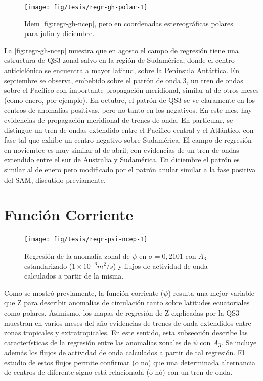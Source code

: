 \documentclass[spanish,a4paper,12pt,oneside]{book}
\begin{document}
\begin{figure}
\texttt{[image: fig/tesis/regr-gh-polar-1]} \caption{Idem \autoref{fig:regr-gh-ncep}, pero en coordenadas estereográficas polares para julio y diciembre.}\label{fig:regr-gh-polar}
\end{figure}

La \autoref{fig:regr-gh-ncep} muestra que en agosto el campo de
regresión tiene una estructura de QS3 zonal salvo en la región de
Sudamérica, donde el centro anticiclónico se encuentra a mayor latitud,
sobre la Península Antártica. En septiembre se observa, embebido sobre
el patrón de onda 3, un tren de ondas sobre el Pacífico con importante
propagación meridional, similar al de otros meses (como enero, por
ejemplo). En octubre, el patrón de QS3 se ve claramente en los centros
de anomalías positivas, pero no tanto en los negativos. En este mes, hay
evidencias de propagación meridional de trenes de onda. En particular,
se distingue un tren de ondas extendido entre el Pacífico central y el
Atlántico, con fase tal que exhibe un centro negativo sobre Sudamérica.
El campo de regresión en noviembre es muy similar al de abril; con
evidencias de un tren de ondas extendido entre el sur de Australia y
Sudamérica. En diciembre el patrón es similar al de enero pero
modificado por el patrón anular similar a la fase positiva del SAM,
discutido previamente.

\section*{Función Corriente}

\begin{landscape}\begin{figure}

{\centering \texttt{[image: fig/tesis/regr-psi-ncep-1]} 

}

\caption{Regresión de la anomalía zonal de $\psi$ en $\sigma = 0,2101$ con $A_3$ estandarizado ($1\times10^{-6}m^2/s$) y flujos de actividad de onda calculados a partir de la misma.}\label{fig:regr-psi-ncep}
\end{figure}
\end{landscape}

Como se mostró previamente, la función corriente (\(\psi\)) resulta una
mejor variable que Z para describir anomalías de circulación tanto sobre
latitudes ecuatoriales como polares. Asimismo, los mapas de regresión de
Z explicadas por la QS3 muestran en varios meses del año evidencias de
trenes de onda extendidos entre zonas tropicales y extratropicales. En
este sentido, esta subsección describe las características de la
regresión entre las anomalías zonales de \(\psi\) con \(A_3\). Se
incluye además los flujos de actividad de onda calculados a partir de
tal regresión. El estudio de estos flujos permite confirmar (o no) que
una determinada alternancia de centros de diferente signo está
relacionada (o nó) con un tren de onda.
\end{document}
